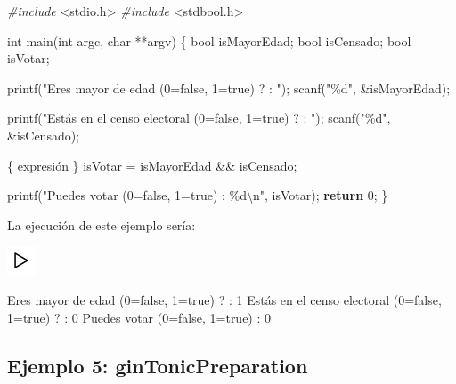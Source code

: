 \documentclass[
]{book}
\newenvironment{Shaded}{\begin{snugshade}}{\end{snugshade}}
\newcommand{\ControlFlowTok}[1]{\textcolor[rgb]{0.13,0.29,0.53}{\textbf{#1}}}
\newcommand{\DataTypeTok}[1]{\textcolor[rgb]{0.13,0.29,0.53}{#1}}
\newcommand{\DecValTok}[1]{\textcolor[rgb]{0.00,0.00,0.81}{#1}}
\newcommand{\ImportTok}[1]{#1}
\newcommand{\NormalTok}[1]{#1}
\newcommand{\PreprocessorTok}[1]{\textcolor[rgb]{0.56,0.35,0.01}{\textit{#1}}}
\newcommand{\SpecialCharTok}[1]{\textcolor[rgb]{0.00,0.00,0.00}{#1}}
\newcommand{\StringTok}[1]{\textcolor[rgb]{0.31,0.60,0.02}{#1}}
\begin{document}
\begin{Shaded}
\begin{Highlighting}[]
\PreprocessorTok{\#include }\ImportTok{\textless{}stdio.h\textgreater{}}
\PreprocessorTok{\#include }\ImportTok{\textless{}stdbool.h\textgreater{}}

\DataTypeTok{int}\NormalTok{ main(}\DataTypeTok{int}\NormalTok{ argc, }\DataTypeTok{char}\NormalTok{ **argv) \{}
    \DataTypeTok{bool}\NormalTok{ isMayorEdad;}
    \DataTypeTok{bool}\NormalTok{ isCensado;}
    \DataTypeTok{bool}\NormalTok{ isVotar;}

\NormalTok{    printf(}\StringTok{"Eres mayor de edad (0=false, 1=true) ? : "}\NormalTok{);}
\NormalTok{    scanf(}\StringTok{"\%d"}\NormalTok{, \&isMayorEdad);}

\NormalTok{    printf(}\StringTok{"Estás en el censo electoral (0=false, 1=true) ? : "}\NormalTok{);}
\NormalTok{    scanf(}\StringTok{"\%d"}\NormalTok{, \&isCensado);}

\NormalTok{    \{ expresión \}}
\NormalTok{    isVotar = isMayorEdad \&\& isCensado;}

\NormalTok{    printf(}\StringTok{"Puedes votar (0=false, 1=true) : \%d}\SpecialCharTok{\textbackslash{}n}\StringTok{"}\NormalTok{, isVotar);}
    \ControlFlowTok{return} \DecValTok{0}\NormalTok{;}
\NormalTok{\}}
\end{Highlighting}
\end{Shaded}

La ejecución de este ejemplo sería:

\includegraphics{./img/play.png}

\begin{Shaded}
\begin{Highlighting}[]
\NormalTok{Eres mayor de edad (}\DecValTok{0}\NormalTok{=false, }\DecValTok{1}\NormalTok{=true) ? : }\DecValTok{1}
\NormalTok{Estás en el censo electoral (}\DecValTok{0}\NormalTok{=false, }\DecValTok{1}\NormalTok{=true) ? : }\DecValTok{0}
\NormalTok{Puedes votar (}\DecValTok{0}\NormalTok{=false, }\DecValTok{1}\NormalTok{=true) : }\DecValTok{0}
\end{Highlighting}
\end{Shaded}

\hypertarget{ejemplo-5-gintonicpreparation}{%
\subsection{Ejemplo 5: ginTonicPreparation}\label{ejemplo-5-gintonicpreparation}}
\end{document}
